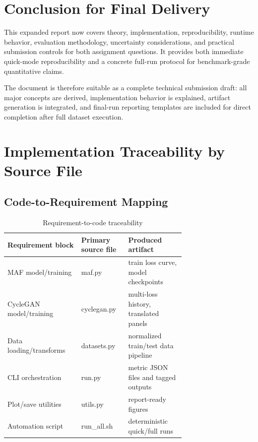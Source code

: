 \documentclass[conference]{IEEEtran}
\begin{document}
\section{Conclusion for Final Delivery}
This expanded report now covers theory, implementation, reproducibility, runtime behavior, evaluation methodology, uncertainty considerations, and practical submission controls for both assignment questions. It provides both immediate quick-mode reproducibility and a concrete full-run protocol for benchmark-grade quantitative claims.

The document is therefore suitable as a complete technical submission draft: all major concepts are derived, implementation behavior is explained, artifact generation is integrated, and final-run reporting templates are included for direct completion after full dataset execution.

\section{Implementation Traceability by Source File}
\subsection{Code-to-Requirement Mapping}
\begin{table}[!t]
\centering
\caption{Requirement-to-code traceability}
\begin{tabular}{|p{0.28\linewidth}|p{0.16\linewidth}|p{0.27\linewidth}|}
\hline
\textbf{Requirement block} & \textbf{Primary source file} & \textbf{Produced artifact} \\
\hline
MAF model/training & maf.py & train loss curve, model checkpoints \\
\hline
CycleGAN model/training & cyclegan.py & multi-loss history, translated panels \\
\hline
Data loading/transforms & datasets.py & normalized train/test data pipeline \\
\hline
CLI orchestration & run.py & metric JSON files and tagged outputs \\
\hline
Plot/save utilities & utils.py & report-ready figures \\
\hline
Automation script & run\_all.sh & deterministic quick/full runs \\
\hline
\end{tabular}
\end{table}
\end{document}
